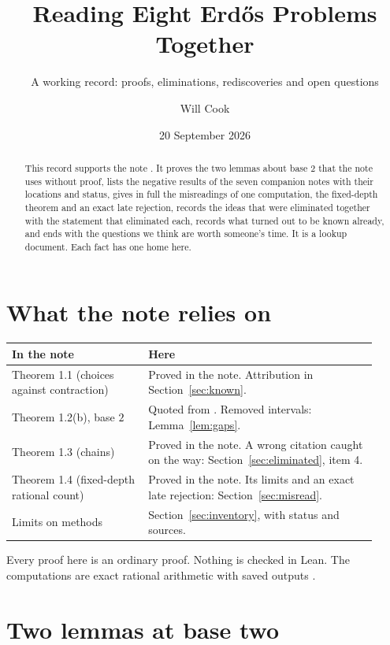 \documentclass[11pt]{article}
\title{Reading Eight Erd\H{o}s Problems Together}
\subtitle{A working record: proofs, eliminations, rediscoveries and open questions}
\author{Will Cook}
\date{20 September 2026}
\begin{document}
\maketitle
\noteprovenance

\begin{abstract}
This record supports the note \cite{plectisshort}.  It proves the two lemmas
about base $2$ that the note uses without proof, lists the negative results of
the seven companion notes with their locations and status, gives in full the
misreadings of one computation, the fixed-depth theorem and an exact late rejection,
records the ideas that were eliminated together with the statement that
eliminated each, records what turned out to be known already, and ends with the
questions we think are worth someone's time.  It is a lookup document.  Each
fact has one home here.
\end{abstract}

\section{What the note relies on}\label{sec:map}

\begin{center}
\small
\begin{tabular}{p{0.34\linewidth}p{0.58\linewidth}}
\hline
In the note & Here \\
\hline
Theorem 1.1 (choices against contraction) & Proved in the note.  Attribution in Section~\ref{sec:known}. \\
Theorem 1.2(b), base $2$ & Quoted from \cite[Section~7]{plectis257}.  Removed intervals: Lemma~\ref{lem:gaps}. \\
Theorem 1.3 (chains) & Proved in the note.  A wrong citation caught on the way: Section~\ref{sec:eliminated}, item 4. \\
Theorem 1.4 (fixed-depth rational count) & Proved in the note.  Its limits and an exact late rejection: Section~\ref{sec:misread}. \\
Limits on methods & Section~\ref{sec:inventory}, with status and sources. \\
\hline
\end{tabular}
\end{center}

Every proof here is an ordinary proof.  Nothing is checked in Lean.  The
computations are exact rational arithmetic with saved outputs
\cite{plectisinvestigation}.

\section{Two lemmas at base two}\label{sec:lemmas}
\end{document}
